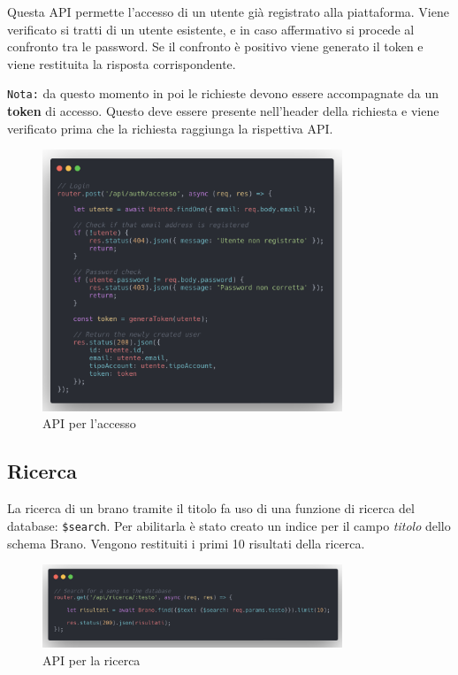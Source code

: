 \documentclass[a4paper,12pt]{article}
\begin{document}
Questa API permette l'accesso di un utente già registrato alla piattaforma. Viene verificato si tratti di un utente esistente, e in caso affermativo si procede al confronto tra le password. Se il confronto è positivo viene generato il token e viene restituita la risposta corrispondente.

\texttt{Nota:} da questo momento in poi le richieste devono essere accompagnate da un \textbf{token} di accesso. Questo deve essere presente nell'header della richiesta e viene verificato prima che la richiesta raggiunga la rispettiva API.

\begin{figure}[htp]
    \centering
    \includegraphics[width=0.8\textwidth]{source-code/api-accesso.png}
    \caption{API per l'accesso}
\end{figure}

\subsection{Ricerca}

La ricerca di un brano tramite il titolo fa uso di una funzione di ricerca del database: \texttt{\$search}. Per abilitarla è stato creato un indice per il campo \textit{titolo} dello schema Brano. Vengono restituiti i primi 10 risultati della ricerca.

\begin{figure}[htp]
    \centering
    \includegraphics[width=0.8\textwidth]{source-code/api-ricerca.png}
    \caption{API per la ricerca}
\end{figure}
\end{document}
